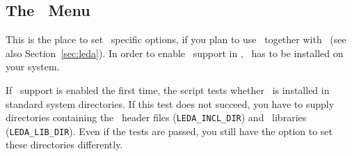 
\subsection{The \leda\ Menu}\label{sec:leda-menu}

This is the place to set \leda\ specific options, if you plan to use
\leda\ together with \cgal\ (see also Section~\ref{sec:leda}). In
order to enable \leda\ support in \cgal, \leda\ has to be installed on
your system.

If \leda\ support is enabled the first time, the script tests whether
\leda\ is installed in standard system directories. If this test does
not succeed, you have to supply directories containing the \leda\ 
header files (\texttt{LEDA\_INCL\_DIR}) and
\leda\ libraries ({\tt LEDA\_LIB\_DIR})\TTindex{LEDA\_LIB\_DIR}.  Even
if the tests are passed, you still have the option to set these
directories differently.\bigskip

